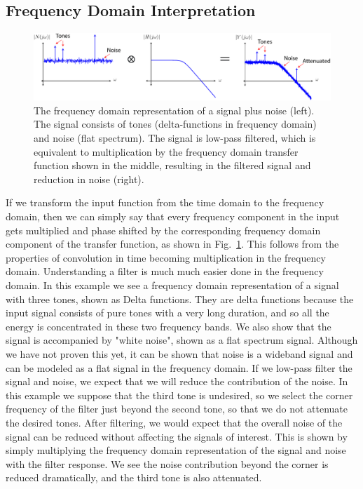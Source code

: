 \subsection{Frequency Domain Interpretation}
\begin{figure}[tb]
\begin{center}
\includegraphics[width=\columnwidth]{sig_noise_freq.pdf}
\end{center}
\caption{The frequency domain representation of a signal plus noise (left).  The signal consists of tones (delta-functions in frequency domain) and noise (flat spectrum).  The signal is low-pass filtered, which is equivalent to multiplication by the frequency domain transfer function shown in the middle, resulting in the filtered signal and reduction in noise (right).} \label{fig:freq_domain}
\end{figure}
If we transform the input function from the time domain to the frequency domain, then we can simply say that every frequency component in the input gets multiplied and phase shifted by the corresponding frequency domain component of the transfer function, as shown in Fig.~\ref{fig:freq_domain}.  This follows from the properties of convolution in time becoming multiplication in the frequency domain.  Understanding a filter is much much easier done in the frequency domain.  In this example we see a frequency domain representation of a signal with three tones, shown as Delta functions.  They are delta functions because the input signal consists of pure tones with a very long duration, and so all the energy is concentrated in these two frequency bands.  We also show that the signal is accompanied by "white noise", shown as a flat spectrum signal.  Although we have not proven this yet, it can be shown that noise is a wideband signal and can be modeled as a flat signal in the frequency domain.
If we low-pass filter the signal and noise, we expect that we will reduce the contribution of the noise.  In this example we suppose that the third tone is undesired, so we select the corner frequency of the filter just beyond the second tone, so that we do not attenuate the desired tones.  After filtering,   we would expect that the overall noise of the signal can be reduced without affecting the signals of interest.  This is shown by simply multiplying the frequency domain representation of the signal and noise with the filter response.  We see the noise contribution beyond the corner is reduced dramatically, and the third tone is also attenuated.
